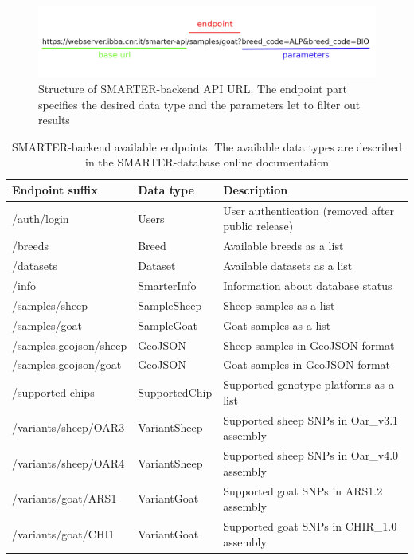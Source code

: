 \documentclass[a4paper,num-refs,gigabyte]{oup-contemporary}
\begin{document}
\begin{figure}
\centering
\includegraphics[width=.45\textwidth]{backend_URL.png}
\caption{Structure of SMARTER-backend API URL. The endpoint part specifies the desired data type and the parameters let to filter out results}
\label{fig:backend_url}
\end{figure}

\begin{table}
\caption{SMARTER-backend available endpoints. The available data types are described in the SMARTER-database online documentation\citep{SMARTERdocs}}
\label{tab:endpoints}
\begin{center}
\begin{tabular}{l l l}
\toprule
Endpoint suffix & Data type & Description \\
\midrule
/auth/login & Users & User authentication (removed after public release)\\
/breeds & Breed & Available breeds as a list \\
/datasets & Dataset & Available datasets as a list \\
/info & SmarterInfo & Information about database status \\
/samples/sheep & SampleSheep & Sheep samples as a list \\
/samples/goat & SampleGoat & Goat samples as a list \\
/samples.geojson/sheep & GeoJSON & Sheep samples in GeoJSON format \\
/samples.geojson/goat & GeoJSON & Goat samples in GeoJSON format \\
/supported-chips & SupportedChip & Supported genotype platforms as a list \\
/variants/sheep/OAR3 & VariantSheep & Supported sheep SNPs in Oar\_v3.1 assembly \\
/variants/sheep/OAR4 & VariantSheep & Supported sheep SNPs in Oar\_v4.0 assembly \\
/variants/goat/ARS1 & VariantGoat & Supported goat SNPs in ARS1.2 assembly \\
/variants/goat/CHI1 & VariantGoat & Supported goat SNPs in CHIR\_1.0 assembly \\
\bottomrule
\end{tabular}
\end{center}
\end{table}
\end{document}

